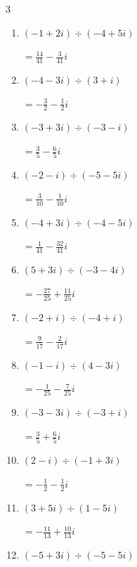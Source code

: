 \begin{multicols}{3}
\begin{enumerate}
        $\displaystyle =1$

  \item $\displaystyle (-1+2i)\div(-4+5i)$

        $\displaystyle =\frac{14}{41}-\frac{3}{41}i$

  \item $\displaystyle (-4-3i)\div(3+i)$

        $\displaystyle =-\frac{3}{2}-\frac{1}{2}i$

  \item $\displaystyle (-3+3i)\div(-3-i)$

        $\displaystyle =\frac{3}{5}-\frac{6}{5}i$

  \item $\displaystyle (-2-i)\div(-5-5i)$

        $\displaystyle =\frac{3}{10}-\frac{1}{10}i$

  \item $\displaystyle (-4+3i)\div(-4-5i)$

        $\displaystyle =\frac{1}{41}-\frac{32}{41}i$

  \item $\displaystyle (5+3i)\div(-3-4i)$

        $\displaystyle =-\frac{27}{25}+\frac{11}{25}i$

\columnbreak %

\resetques

  \item $\displaystyle (-2+i)\div(-4+i)$

        $\displaystyle =\frac{9}{17}-\frac{2}{17}i$

  \item $\displaystyle (-1-i)\div(4-3i)$

        $\displaystyle =-\frac{1}{25}-\frac{7}{25}i$

  \item $\displaystyle (-3-3i)\div(-3+i)$

        $\displaystyle =\frac{3}{5}+\frac{6}{5}i$

  \item $\displaystyle (2-i)\div(-1+3i)$

        $\displaystyle =-\frac{1}{2}-\frac{1}{2}i$

  \item $\displaystyle (3+5i)\div(1-5i)$

        $\displaystyle =-\frac{11}{13}+\frac{10}{13}i$

  \item $\displaystyle (-5+3i)\div(-5-5i)$


\end{enumerate}
\end{multicols}
